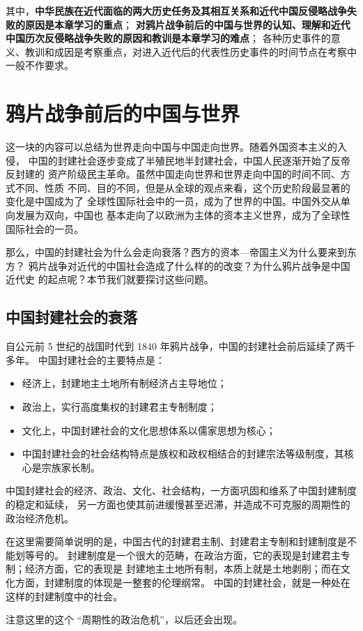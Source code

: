 \documentclass[10pt, UTF8]{book} %
\begin{document}
其中，\textbf{中华民族在近代面临的两大历史任务及其相互关系和近代中国反侵略战争失败的原因是本章学习的重点}；
\textbf{对鸦片战争前后的中国与世界的认知、理解和近代中国历次反侵略战争失败的原因和教训是本章学习的难点}；
各种历史事件的意义、教训和成因是考察重点，对进入近代后的代表性历史事件的时间节点在考察中一般不作要求。

\section{鸦片战争前后的中国与世界}

这一块的内容可以总结为世界走向中国与中国走向世界。随着外国资本主义的入侵，
中国的封建社会逐步变成了半殖民地半封建社会，中国人民逐渐开始了反帝反封建的
资产阶级民主革命。虽然中国走向世界和世界走向中国的时间不同、方式不同、性质
不同、目的不同，但是从全球的观点来看，这个历史阶段最显著的变化是中国成为了
全球性国际社会中的一员，成为了世界的中国。中国外交从单向发展为双向，中国也
基本走向了以欧洲为主体的资本主义世界，成为了全球性国际社会的一员。

那么，中国的封建社会为什么会走向衰落？西方的资本—帝国主义为什么要来到东方？
鸦片战争对近代的中国社会造成了什么样的的改变？为什么鸦片战争是中国近代史
的起点呢？本节我们就要探讨这些问题。

\subsection{中国封建社会的衰落}


自公元前 5 世纪的战国时代到 1840 年鸦片战争，中国的封建社会前后延续了两千多年。
中国封建社会的主要特点是：
\begin{itemize}[itemsep=0pt]
    \item 经济上，封建地主土地所有制经济占主导地位；
    \item 政治上，实行高度集权的封建君主专制制度；
    \item 文化上，中国封建社会的文化思想体系以儒家思想为核心；
    \item 中国封建社会的社会结构特点是族权和政权相结合的封建宗法等级制度，其核心是宗族家长制。
\end{itemize}
中国封建社会的经济、政治、文化、社会结构，一方面巩固和维系了中国封建制度的稳定和延续，
另一方面也使其前进缓慢甚至迟滞，并造成不可克服的周期性的政治经济危机。
\begin{remark}
    在这里需要简单说明的是，中国古代的封建君主制、封建君主专制和封建制度是不能划等号的。
    封建制度是一个很大的范畴，在政治方面，它的表现是封建君主专制；经济方面，它的表现是
    封建地主土地所有制，本质上就是土地剥削；而在文化方面，封建制度的体现是一整套的伦理纲常。
    中国的封建社会，就是一种处在这样的封建制度中的社会。
\end{remark}
\begin{remark}
    注意这里的这个 “周期性的政治危机”，以后还会出现。
\end{remark}
\end{document}
